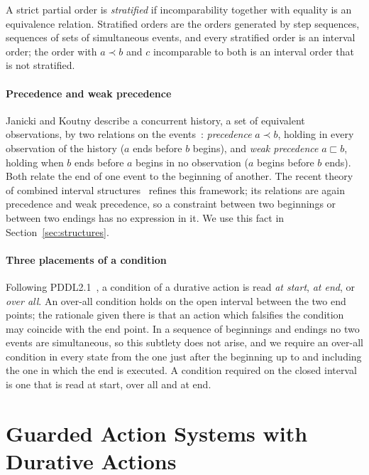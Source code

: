 \documentclass[preprint,12pt]{elsarticle}
\theoremstyle{plain}
\theoremstyle{definition}
\newcommand{\wprec}{\sqsubset}
\begin{document}
A strict partial order is \emph{stratified} if incomparability together with equality is an equivalence relation. Stratified orders are the orders generated by step sequences, sequences of sets of simultaneous events, and every stratified order is an interval order; the order with $a \prec b$ and $c$ incomparable to both is an interval order that is not stratified.

\paragraph{Precedence and weak precedence}
Janicki and Koutny describe a concurrent history, a set of equivalent observations, by two relations on the events~\cite{JanickiKoutny1993,JanickiKoutny1997}: \emph{precedence} $a \prec b$, holding in every observation of the history ($a$ ends before $b$ begins), and \emph{weak precedence} $a \wprec b$, holding when $b$ ends before $a$ begins in no observation ($a$ begins before $b$ ends). Both relate the end of one event to the beginning of another. The recent theory of combined interval structures~\cite{JanickiKleijnKoutnyMikulski2024} refines this framework; its relations are again precedence and weak precedence, so a constraint between two beginnings or between two endings has no expression in it. We use this fact in Section~\ref{sec:structures}.

\paragraph{Three placements of a condition}
Following PDDL2.1~\cite{FoxLong2003}, a condition of a durative action is read \emph{at start}, \emph{at end}, or \emph{over all}. An over-all condition holds on the open interval between the two end points; the rationale given there is that an action which falsifies the condition may coincide with the end point. In a sequence of beginnings and endings no two events are simultaneous, so this subtlety does not arise, and we require an over-all condition in every state from the one just after the beginning up to and including the one in which the end is executed. A condition required on the closed interval is one that is read at start, over all and at end.

\section{Guarded Action Systems with Durative Actions}
\label{sec:model}
\end{document}
